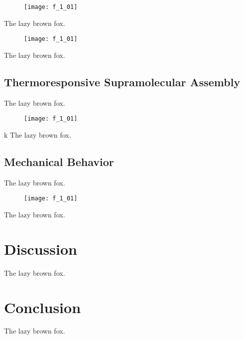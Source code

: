 \begin{refsection}
\begin{figure}[h!]
    \centering
    \texttt{[image: f\_1\_01]}
    \caption{}
    \label{fig:CD_temp_wl}
\end{figure}

The lazy brown fox.

\begin{figure}[h!]
    \centering
    \texttt{[image: f\_1\_01]}
    \caption{}
    \label{fig:CD_computation}
\end{figure}

The lazy brown fox.

\subsection{Thermoresponsive Supramolecular Assembly}

The lazy brown fox.

\begin{figure}[h!]
    \centering
    \texttt{[image: f\_1\_01]}
    \caption{}
    \label{fig:lcst}
\end{figure}
k
The lazy brown fox.

\subsection{Mechanical Behavior}

The lazy brown fox.

\begin{figure}[h!]
    \centering
    \texttt{[image: f\_1\_01]}
    \caption{}
    \label{fig:rheology}
\end{figure}

The lazy brown fox.

\section{Discussion}

The lazy brown fox.

\section{Conclusion}

The lazy brown fox.

\printbibliography[heading=subbibliography]

\end{refsection}
